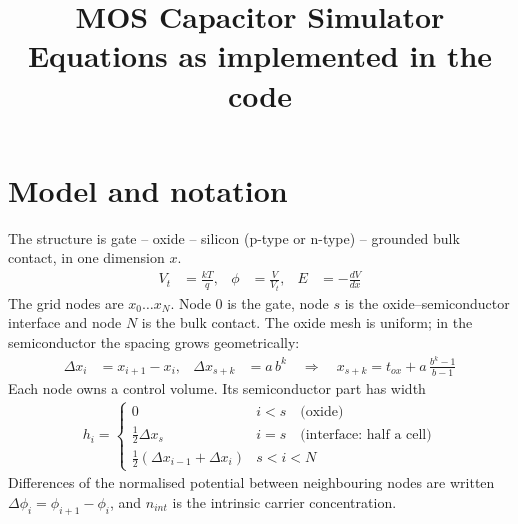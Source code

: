 \documentclass[11pt]{article}
\title{MOS Capacitor Simulator\\[4pt]\large Equations as implemented in the code}
\date{}
\newcommand{\dphi}[1]{\Delta\phi_{#1}}
\newcommand{\half}{\tfrac{1}{2}}
\begin{document}
\maketitle

\section{Model and notation}
The structure is gate -- oxide -- silicon (p-type or n-type) -- grounded bulk contact, in one dimension $x$.
\begin{align}
V_t &= \frac{kT}{q}, & \phi &= \frac{V}{V_t}, & E &= -\frac{dV}{dx}
\end{align}
The grid nodes are $x_0\dots x_N$. Node $0$ is the gate, node $s$ is the oxide--semiconductor interface and
node $N$ is the bulk contact. The oxide mesh is uniform; in the semiconductor the spacing grows geometrically:
\begin{align}
\Delta x_i &= x_{i+1}-x_i, & \Delta x_{s+k} &= a\,b^{k}
\quad\Longrightarrow\quad x_{s+k} = t_{ox} + a\,\frac{b^{k}-1}{b-1}
\end{align}
Each node owns a control volume. Its semiconductor part has width
\begin{align}
h_i = \begin{cases} 0 & i<s \quad\text{(oxide)}\\[2pt]
\half\Delta x_s & i=s \quad\text{(interface: half a cell)}\\[2pt]
\half\left(\Delta x_{i-1}+\Delta x_i\right) & s<i<N \end{cases}
\end{align}
Differences of the normalised potential between neighbouring nodes are written
$\dphi{i}=\phi_{i+1}-\phi_i$, and $n_{int}$ is the intrinsic carrier concentration.
\end{document}
